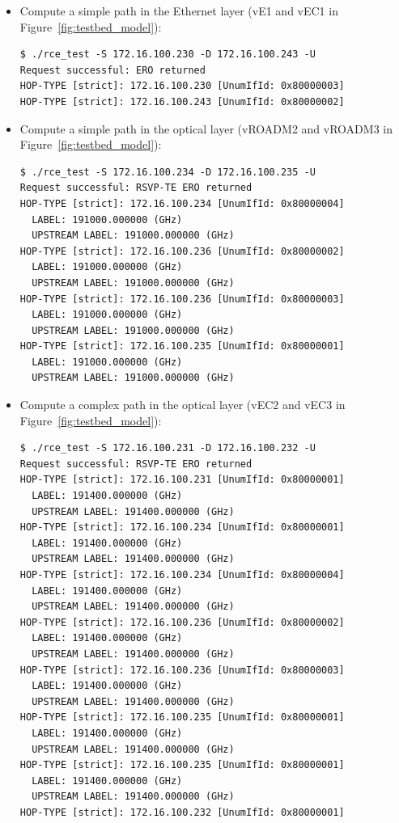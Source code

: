 \documentclass[10pt,a4paper]{report}
\begin{document}
\begin{itemize}
\item{Compute a simple path in the Ethernet layer (vE1 and vEC1 in Figure~\ref{fig:testbed_model}):
{\small
\begin{verbatim}
$ ./rce_test -S 172.16.100.230 -D 172.16.100.243 -U
Request successful: ERO returned
HOP-TYPE [strict]: 172.16.100.230 [UnumIfId: 0x80000003]
HOP-TYPE [strict]: 172.16.100.243 [UnumIfId: 0x80000002]
\end{verbatim}
}}
\item{Compute a simple path in the optical layer (vROADM2 and vROADM3
    in Figure~\ref{fig:testbed_model}): {\small
\begin{verbatim}
$ ./rce_test -S 172.16.100.234 -D 172.16.100.235 -U
Request successful: RSVP-TE ERO returned
HOP-TYPE [strict]: 172.16.100.234 [UnumIfId: 0x80000004]
  LABEL: 191000.000000 (GHz)
  UPSTREAM LABEL: 191000.000000 (GHz)
HOP-TYPE [strict]: 172.16.100.236 [UnumIfId: 0x80000002]
  LABEL: 191000.000000 (GHz)
  UPSTREAM LABEL: 191000.000000 (GHz)
HOP-TYPE [strict]: 172.16.100.236 [UnumIfId: 0x80000003]
  LABEL: 191000.000000 (GHz)
  UPSTREAM LABEL: 191000.000000 (GHz)
HOP-TYPE [strict]: 172.16.100.235 [UnumIfId: 0x80000001]
  LABEL: 191000.000000 (GHz)
  UPSTREAM LABEL: 191000.000000 (GHz)
\end{verbatim}
}}
\newpage
\item{Compute a complex path in the optical layer (vEC2 and vEC3 in
    Figure~\ref{fig:testbed_model}): {\small
\begin{verbatim} 
$ ./rce_test -S 172.16.100.231 -D 172.16.100.232 -U
Request successful: RSVP-TE ERO returned
HOP-TYPE [strict]: 172.16.100.231 [UnumIfId: 0x80000001]
  LABEL: 191400.000000 (GHz)
  UPSTREAM LABEL: 191400.000000 (GHz)
HOP-TYPE [strict]: 172.16.100.234 [UnumIfId: 0x80000001]
  LABEL: 191400.000000 (GHz)
  UPSTREAM LABEL: 191400.000000 (GHz)
HOP-TYPE [strict]: 172.16.100.234 [UnumIfId: 0x80000004]
  LABEL: 191400.000000 (GHz)
  UPSTREAM LABEL: 191400.000000 (GHz)
HOP-TYPE [strict]: 172.16.100.236 [UnumIfId: 0x80000002]
  LABEL: 191400.000000 (GHz)
  UPSTREAM LABEL: 191400.000000 (GHz)
HOP-TYPE [strict]: 172.16.100.236 [UnumIfId: 0x80000003]
  LABEL: 191400.000000 (GHz)
  UPSTREAM LABEL: 191400.000000 (GHz)
HOP-TYPE [strict]: 172.16.100.235 [UnumIfId: 0x80000001]
  LABEL: 191400.000000 (GHz)
  UPSTREAM LABEL: 191400.000000 (GHz)
HOP-TYPE [strict]: 172.16.100.235 [UnumIfId: 0x80000001]
  LABEL: 191400.000000 (GHz)
  UPSTREAM LABEL: 191400.000000 (GHz)
HOP-TYPE [strict]: 172.16.100.232 [UnumIfId: 0x80000001]

\end{verbatim}}}
\end{itemize}
\end{document}
